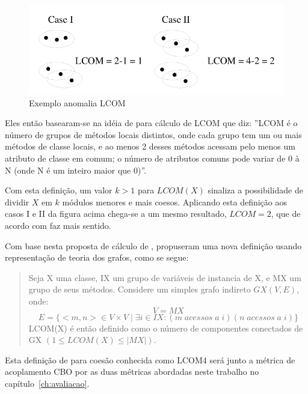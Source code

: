 \begin{figure}[h]
\center
\includegraphics[scale=0.4]{imagens/exemplo-anomalia-lcom1-hitz-e-montazeri}
\caption{Exemplo anomalia LCOM \cite{measuringCouplingAndCohesion}}
\label{fig:exemplo-anomalia-lcom1}
\end{figure}

Eles então basearam-se na idéia de
 para cálculo de LCOM que diz:
''LCOM é o número de grupos de métodos locais distintos, onde cada grupo tem um
ou mais métodos de classe locais, e ao menos 2 desses métodos acessam pelo
menos um atributo de classe em comum; o número de atributos comuns pode variar
de 0 à N (onde N é um inteiro maior que 0)''.

Com esta definição, um valor $k > 1$ para $LCOM(X)$ sinaliza a possibilidade de
dividir $X$ em $k$ módulos menores e mais coesos. Aplicando esta definição aos
casos I e II da figura acima chega-se a um mesmo resultado, $LCOM = 2$, que de
acordo com  faz mais sentido.

Com base nesta proposta de cálculo de
,
 propuseram uma nova definição usando
representação de teoria dos grafos, como se segue:

\begin{quotation}
Seja X uma classe, IX um grupo de variáveis de instancia de X, e MX um grupo
de seus métodos. Considere um simples grafo indireto $GX(V, E)$, onde: $$V =
MX$$ $$E = \{<m, n> \in V \times V \mid \exists i \in IX: (m \; acessos \; a \;
i) (n \; acessos \; a \; i)\}$$ LCOM(X) é então definido como o número de componentes
conectados de GX $(1 \leq LCOM(X) \leq |MX|)$.
\end{quotation}

Esta definição de  para coesão
conhecida como LCOM4 será junto a métrica de acoplamento CBO por
 as duas métricas abordadas neste trabalho no
capítulo~\ref{ch:avaliacao}.

